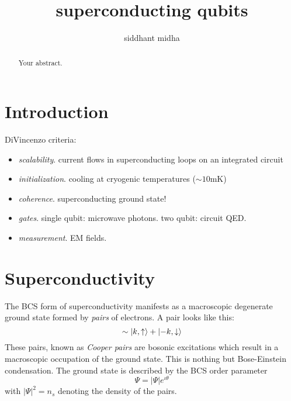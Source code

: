\documentclass{article}
\title{superconducting qubits}
\author{siddhant midha}
\begin{document}
\maketitle

\begin{abstract}
Your abstract.
\end{abstract}

\section{Introduction}
DiVincenzo criteria:
\begin{itemize}
    \item \textit{scalability}. current flows in superconducting loops on an integrated circuit
    \item \textit{initialization}. cooling at cryogenic temperatures ($\sim 10$mK)
    \item \textit{coherence}. superconducting ground state!
    \item \textit{gates}. single qubit: microwave photons. two qubit: circuit QED.
    \item \textit{measurement}. EM fields.
\end{itemize}

\section{Superconductivity}
The BCS form of superconductivity manifests as a macroscopic degenerate ground state formed by \textit{pairs} of electrons. A pair looks like this:
\begin{equation}
    \sim \ket{k,\uparrow} + \ket{-k,\downarrow}
\end{equation}
These pairs, known as \textit{Cooper pairs} are bosonic excitations which result in a macroscopic occupation of the ground state. This is nothing but Bose-Einstein condensation. The ground state is described by the BCS order parameter
\begin{equation}
    \Psi = |\Psi|e^{\iota\theta}
\end{equation}
with $|\Psi|^2 = n_s$ denoting the density of the pairs.
\end{document}
